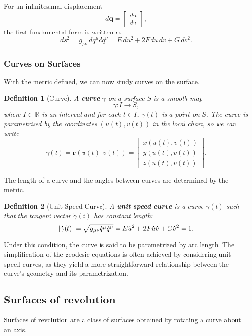 \documentclass[12pt]{article}
\newcommand{\R}{\mathbb{R}}
\newtheorem{definition}{Definition}[section]
\begin{document}
For an infinitesimal displacement
\[
    d\mathbf{q} = \begin{bmatrix} du \\ dv \end{bmatrix},
\]
the first fundamental form is written as
\[
    ds^2 = g_{\mu\nu}\, dq^\mu dq^\nu = E\, du^2 + 2F\, du\, dv + G\, dv^2.
\]

\subsubsection{Curves on Surfaces}

With the metric defined, we can now study curves on the surface.

\begin{definition}[Curve]
A \textbf{curve} $\gamma$ on a surface $S$ is a smooth map
\[
    \gamma : I \to S,
\]
where $I \subset \R$ is an interval and for each $t\in I$, $\gamma(t)$ is a point on $S$.
The curve is parametrized by the coordinates $(u(t), v(t))$ in the local chart, so we can write
\[
    \gamma(t) = \mathbf{r}(u(t), v(t)) = \begin{bmatrix} x(u(t), v(t)) \\ y(u(t), v(t)) \\ z(u(t), v(t)) \end{bmatrix}.
\]
\end{definition}

The length of a curve and the angles between curves are determined by the metric. 

\begin{definition}[Unit Speed Curve]
A \textbf{unit speed curve} is a curve $\gamma(t)$ such that the tangent vector $\dot{\gamma}(t)$ has constant length:
\[
    \abs{\dot{\gamma}(t)} = \sqrt{g_{\mu\nu} \dot{q}^\mu \dot{q}^\nu} = E \dot{u}^2 + 2F \dot{u} \dot{v} + G \dot{v}^2 = 1.
\]
\end{definition}

Under this condition, the curve is said to be parametrized by arc length.
The simplification of the geodesic equations is often achieved by considering unit speed curves, as they yield a more straightforward relationship between the curve's geometry and its parametrization.

\subsection{Surfaces of revolution}

Surfaces of revolution are a class of surfaces obtained by rotating a curve about an axis.
\end{document}
